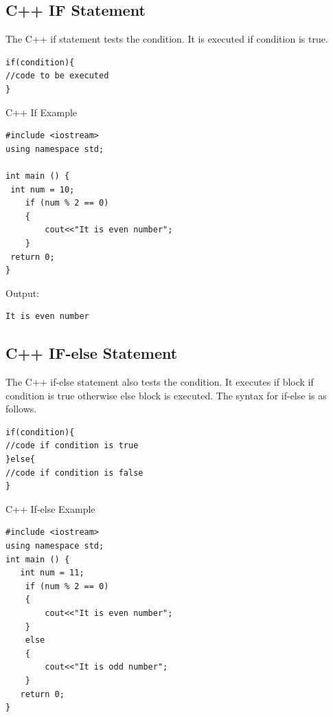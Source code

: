 \documentclass{book}
\begin{document}
\subsection{C++ IF Statement}

The C++ if statement tests the condition. It is executed if condition is true.

\begin{Verbatim}
if(condition){    
//code to be executed    
}  
\end{Verbatim}


C++ If Example

\begin{lstlisting}
#include <iostream>  
using namespace std;  
   
int main () {  
 int num = 10;    
	if (num % 2 == 0)    
	{    
		cout<<"It is even number";    
	}   
 return 0;  
}  
\end{lstlisting}

Output:

\begin{Verbatim}
It is even number
\end{Verbatim}

\subsection{C++ IF-else Statement}

The C++ if-else statement also tests the condition. It executes if block if condition is true otherwise else block is executed. The syntax for if-else is as follows. 

\begin{lstlisting}
if(condition){    
//code if condition is true    
}else{    
//code if condition is false    
}    
\end{lstlisting}

C++ If-else Example

\begin{lstlisting}
#include <iostream>  
using namespace std;  
int main () {  
   int num = 11;    
	if (num % 2 == 0)    
	{    
		cout<<"It is even number";    
	}   
	else  
	{    
		cout<<"It is odd number";    
	}  
   return 0;  
}  

\end{lstlisting}
\end{document}
